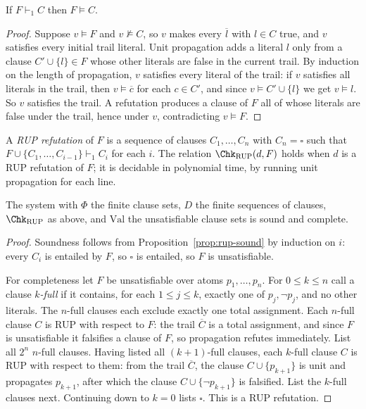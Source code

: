 \begin{proposition}
\label{prop:rup-sound}
If $F\vdash_1 C$ then $F\models C$.
\end{proposition}

\begin{proof}
Suppose $v\models F$ and $v\not\models C$, so $v$ makes every $\overline{l}$ with $l\in C$ true, and $v$ satisfies every initial trail literal. Unit propagation adds a literal $l$ only from a clause $C'\cup\{l\}\in F$ whose other literals are false in the current trail. By induction on the length of propagation, $v$ satisfies every literal of the trail: if $v$ satisfies all literals in the trail, then $v\models\overline{c}$ for each $c\in C'$, and since $v\models C'\cup\{l\}$ we get $v\models l$. So $v$ satisfies the trail. A refutation produces a clause of $F$ all of whose literals are false under the trail, hence under $v$, contradicting $v\models F$.
\end{proof}

\begin{definition}
\label{def:rup-refutation}
A \emph{RUP refutation} of $F$ is a sequence of clauses $C_1,\dots,C_n$ with $C_n=\square$ such that $F\cup\{C_1,\dots,C_{i-1}\}\vdash_1C_i$ for each $i$. The relation $\Chk_{\mathrm{RUP}}(d,F)$ holds when $d$ is a RUP refutation of $F$; it is decidable in polynomial time, by running unit propagation for each line.
\end{definition}

\begin{theorem}
\label{thm:rup-complete}
The system with $\Phi$ the finite clause sets, $D$ the finite sequences of clauses, $\Chk_{\mathrm{RUP}}$ as above, and $\mathrm{Val}$ the unsatisfiable clause sets is sound and complete.
\end{theorem}

\begin{proof}
Soundness follows from Proposition~\ref{prop:rup-sound} by induction on $i$: every $C_i$ is entailed by $F$, so $\square$ is entailed, so $F$ is unsatisfiable.

For completeness let $F$ be unsatisfiable over atoms $p_1,\dots,p_n$. For $0\le k\le n$ call a clause \emph{$k$-full} if it contains, for each $1\le j\le k$, exactly one of $p_j,\neg p_j$, and no other literals. The $n$-full clauses each exclude exactly one total assignment. Each $n$-full clause $C$ is RUP with respect to $F$: the trail $\overline{C}$ is a total assignment, and since $F$ is unsatisfiable it falsifies a clause of $F$, so propagation refutes immediately. List all $2^n$ $n$-full clauses. Having listed all $(k+1)$-full clauses, each $k$-full clause $C$ is RUP with respect to them: from the trail $\overline{C}$, the clause $C\cup\{p_{k+1}\}$ is unit and propagates $p_{k+1}$, after which the clause $C\cup\{\neg p_{k+1}\}$ is falsified. List the $k$-full clauses next. Continuing down to $k=0$ lists $\square$. This is a RUP refutation.
\end{proof}


